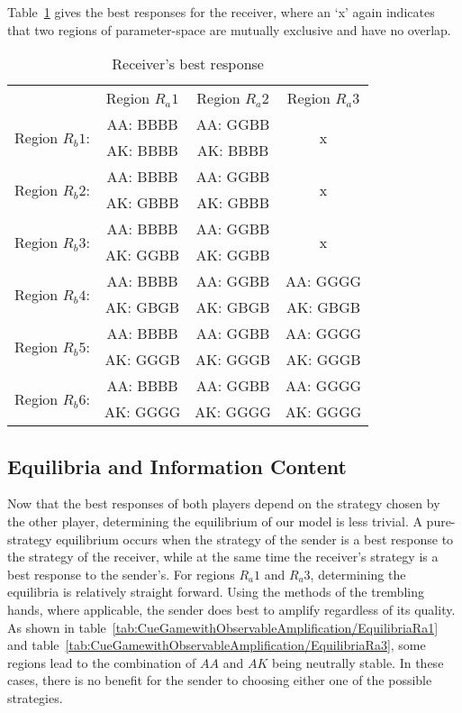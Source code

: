 \documentclass[a4paper,12pt]{article}
\numberwithin{equation}{section}
\renewcommand*{\arraystretch}{1.4}
\begin{document}
Table~\ref{tab:CueGamewithObservableAmplification/BestResponseR} gives the best responses for the receiver, where an `x' again indicates that two regions of parameter-space are mutually exclusive and have no overlap.

\begin{table}[h]
\renewcommand*{\arraystretch}{1.35}
\begin{center}
\begin{tabular}{lccc}
 & Region $R_{a}1$ & Region $R_{a}2$ & Region $R_{a}3$\\
\multirow{2}{*}{Region $R_{b}1$:} & AA: BBBB & AA: GGBB & \multirow{2}{*}{x}\\
& AK: BBBB & AK: BBBB &\\
\multirow{2}{*}{Region $R_{b}2$:} & AA: BBBB & AA: GGBB & \multirow{2}{*}{x}\\
& AK: GBBB & AK: GBBB &\\
\multirow{2}{*}{Region $R_{b}3$:} & AA: BBBB & AA: GGBB & \multirow{2}{*}{x}\\
& AK: GGBB & AK: GGBB &\\
\multirow{2}{*}{Region $R_{b}4$:} & AA: BBBB & AA: GGBB & AA: GGGG\\
& AK: GBGB & AK: GBGB & AK: GBGB\\
\multirow{2}{*}{Region $R_{b}5$:} & AA: BBBB & AA: GGBB & AA: GGGG\\
& AK: GGGB & AK: GGGB & AK: GGGB\\
\multirow{2}{*}{Region $R_{b}6$:} & AA: BBBB & AA: GGBB & AA: GGGG\\
& AK: GGGG & AK: GGGG & AK: GGGG
\end{tabular}
\end{center}
\caption{Receiver's best response}
\label{tab:CueGamewithObservableAmplification/BestResponseR}
\end{table}


\subsection{Equilibria and Information Content}
\label{sec:Cue Game with Observable Amplification/Equilibria}

Now that the best responses of both players depend on the strategy chosen by the other player, determining the equilibrium of our model is less trivial. A pure-strategy equilibrium occurs when the strategy of the sender is a best response to the strategy of the receiver, while at the same time the receiver's strategy is a best response to the sender's. For regions $R_{a}1$ and $R_{a}3$, determining the equilibria is relatively straight forward. Using the methods of the trembling hands, where applicable, the sender does best to amplify regardless of its quality. As shown in table~\ref{tab:CueGamewithObservableAmplification/EquilibriaRa1} and table~\ref{tab:CueGamewithObservableAmplification/EquilibriaRa3}, some regions lead to the combination of $AA$ and $AK$ being neutrally stable. In these cases, there is no benefit for the sender to choosing either one of the possible strategies.
\end{document}
